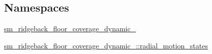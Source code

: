 \subsection*{Namespaces}
\begin{DoxyCompactItemize}
\item 
 \hyperlink{namespacesm__ridgeback__floor__coverage__dynamic__1}{sm\+\_\+ridgeback\+\_\+floor\+\_\+coverage\+\_\+dynamic\+\_}
\item 
 \hyperlink{namespacesm__ridgeback__floor__coverage__dynamic__1_1_1radial__motion__states}{sm\+\_\+ridgeback\+\_\+floor\+\_\+coverage\+\_\+dynamic\+\_\+::radial\+\_\+motion\+\_\+states}
\end{DoxyCompactItemize}
